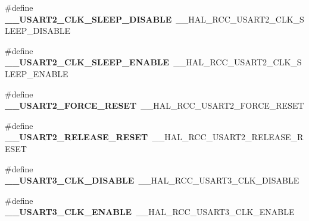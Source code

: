 \begin{DoxyCompactItemize}
\item 
\mbox{\label{group___h_a_l___r_c_c___aliased_ga7996fe6f4f857778c4acbd62a106bdce}} 
\#define {\bfseries \+\_\+\+\_\+\+U\+S\+A\+R\+T2\+\_\+\+C\+L\+K\+\_\+\+S\+L\+E\+E\+P\+\_\+\+D\+I\+S\+A\+B\+LE}~\+\_\+\+\_\+\+H\+A\+L\+\_\+\+R\+C\+C\+\_\+\+U\+S\+A\+R\+T2\+\_\+\+C\+L\+K\+\_\+\+S\+L\+E\+E\+P\+\_\+\+D\+I\+S\+A\+B\+LE
\item 
\mbox{\label{group___h_a_l___r_c_c___aliased_gad7970d225de9a77f3fc745293ca316ed}} 
\#define {\bfseries \+\_\+\+\_\+\+U\+S\+A\+R\+T2\+\_\+\+C\+L\+K\+\_\+\+S\+L\+E\+E\+P\+\_\+\+E\+N\+A\+B\+LE}~\+\_\+\+\_\+\+H\+A\+L\+\_\+\+R\+C\+C\+\_\+\+U\+S\+A\+R\+T2\+\_\+\+C\+L\+K\+\_\+\+S\+L\+E\+E\+P\+\_\+\+E\+N\+A\+B\+LE
\item 
\mbox{\label{group___h_a_l___r_c_c___aliased_ga979c0d058e16fdea1923807ab635f4dd}} 
\#define {\bfseries \+\_\+\+\_\+\+U\+S\+A\+R\+T2\+\_\+\+F\+O\+R\+C\+E\+\_\+\+R\+E\+S\+ET}~\+\_\+\+\_\+\+H\+A\+L\+\_\+\+R\+C\+C\+\_\+\+U\+S\+A\+R\+T2\+\_\+\+F\+O\+R\+C\+E\+\_\+\+R\+E\+S\+ET
\item 
\mbox{\label{group___h_a_l___r_c_c___aliased_ga0b8442b95cc856fb66c66874d511c5bb}} 
\#define {\bfseries \+\_\+\+\_\+\+U\+S\+A\+R\+T2\+\_\+\+R\+E\+L\+E\+A\+S\+E\+\_\+\+R\+E\+S\+ET}~\+\_\+\+\_\+\+H\+A\+L\+\_\+\+R\+C\+C\+\_\+\+U\+S\+A\+R\+T2\+\_\+\+R\+E\+L\+E\+A\+S\+E\+\_\+\+R\+E\+S\+ET
\item 
\mbox{\label{group___h_a_l___r_c_c___aliased_ga5493319829b9739c7495cc765162f4b3}} 
\#define {\bfseries \+\_\+\+\_\+\+U\+S\+A\+R\+T3\+\_\+\+C\+L\+K\+\_\+\+D\+I\+S\+A\+B\+LE}~\+\_\+\+\_\+\+H\+A\+L\+\_\+\+R\+C\+C\+\_\+\+U\+S\+A\+R\+T3\+\_\+\+C\+L\+K\+\_\+\+D\+I\+S\+A\+B\+LE
\item 
\mbox{\label{group___h_a_l___r_c_c___aliased_ga821236fc8d13c8b707128514c0a42a02}} 
\#define {\bfseries \+\_\+\+\_\+\+U\+S\+A\+R\+T3\+\_\+\+C\+L\+K\+\_\+\+E\+N\+A\+B\+LE}~\+\_\+\+\_\+\+H\+A\+L\+\_\+\+R\+C\+C\+\_\+\+U\+S\+A\+R\+T3\+\_\+\+C\+L\+K\+\_\+\+E\+N\+A\+B\+LE
\item 
\mbox{\label{group___h_a_l___r_c_c___aliased_ga32b28245d8d5a75b7182779315cb74d8}} 

\end{DoxyCompactItemize}
